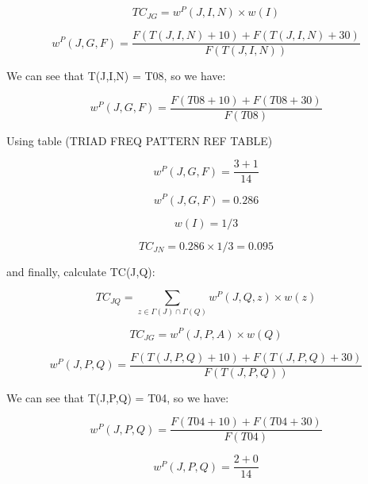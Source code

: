 \begin{equation}
TC_{JG} = w^{P}(J, I, N) \times w(I)  
\end{equation}

\begin{equation}
w^{P}(J,G,F) = \frac{F(T(J,I,N) + 10) + F(T(J,I,N) + 30)}{F(T(J,I,N))}
\end{equation}

We can see that T(J,I,N) = T08, so we have:

\begin{equation}
w^{P}(J,G,F) = \frac{F(T08 + 10) + F(T08 + 30)}{F(T08)}
\end{equation}

Using table (TRIAD FREQ PATTERN REF TABLE)

\begin{equation}
w^{P}(J,G,F) = \frac{3 + 1}{14}
\end{equation}

\begin{equation}
w^{P}(J,G,F) = 0.286
\end{equation}

\begin{equation}
w(I)=1/3
\end{equation}

\begin{equation}
TC_{JN} = 0.286 \times 1/3 = 0.095
\end{equation}


and finally, calculate TC(J,Q):


\begin{equation}
TC_{JQ} = \sum_{z\in \Gamma(J)\cap \Gamma(Q)} w^{P}(J, Q, z) \times w(z)  
\end{equation}

\begin{equation}
TC_{JG} = w^{P}(J, P, A) \times w(Q)  
\end{equation}

\begin{equation}
w^{P}(J,P,Q) = \frac{F(T(J,P,Q) + 10) + F(T(J,P,Q) + 30)}{F(T(J,P,Q))}
\end{equation}

We can see that T(J,P,Q) = T04, so we have:

\begin{equation}
w^{P}(J,P,Q) = \frac{F(T04 + 10) + F(T04 + 30)}{F(T04)}
\end{equation}

\begin{equation}
w^{P}(J,P,Q) = \frac{2 + 0}{14}
\end{equation}

